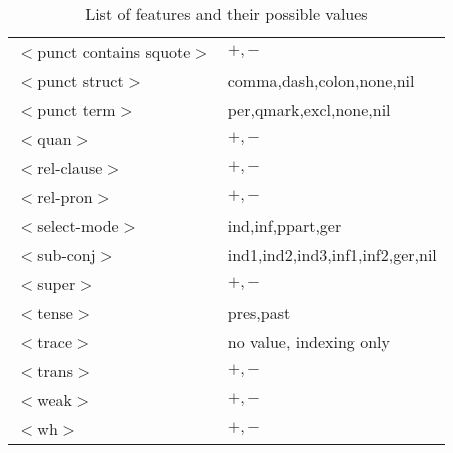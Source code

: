 \begin{table}[hbt]
\begin{tabular}{|l|l|}
$<$punct contains squote$>$&$+,-$\\
$<$punct struct$>$&comma,dash,colon,none,nil\\
$<$punct term$>$&per,qmark,excl,none,nil\\
$<$quan$>$&$+,-$\\
$<$rel-clause$>$&$+,-$\\
$<$rel-pron$>$&$+,-$\\
$<$select-mode$>$&ind,inf,ppart,ger\\
$<$sub-conj$>$&ind1,ind2,ind3,inf1,inf2,ger,nil\\
$<$super$>$&$+,-$\\
$<$tense$>$&pres,past\\
$<$trace$>$&no value, indexing only\\
$<$trans$>$&$+,-$\\
$<$weak$>$&$+,-$\\
$<$wh$>$&$+,-$\\
\hline
\end{tabular}
\caption{List of features and their possible values}
\label{feature-table}
\end{table}

\normalsize

